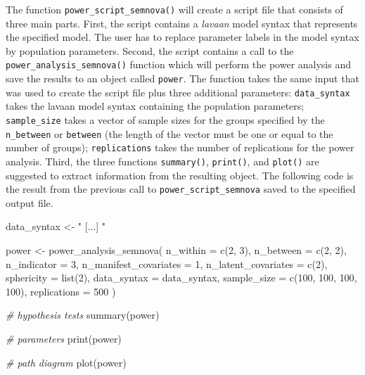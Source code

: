 \documentclass[
]{book}
\newenvironment{Shaded}{\begin{snugshade}}{\end{snugshade}}
\newcommand{\AttributeTok}[1]{\textcolor[rgb]{0.77,0.63,0.00}{#1}}
\newcommand{\CommentTok}[1]{\textcolor[rgb]{0.56,0.35,0.01}{\textit{#1}}}
\newcommand{\DecValTok}[1]{\textcolor[rgb]{0.00,0.00,0.81}{#1}}
\newcommand{\FunctionTok}[1]{\textcolor[rgb]{0.00,0.00,0.00}{#1}}
\newcommand{\NormalTok}[1]{#1}
\newcommand{\OtherTok}[1]{\textcolor[rgb]{0.56,0.35,0.01}{#1}}
\newcommand{\StringTok}[1]{\textcolor[rgb]{0.31,0.60,0.02}{#1}}
\begin{document}
The function \texttt{power\_script\_semnova()} will create a script file that consists of three main parts. First, the script contains a \emph{lavaan} model syntax that represents the specified model. The user has to replace parameter labels in the model syntax by population parameters. Second, the script contains a call to the \texttt{power\_analysis\_semnova()} function which will perform the power analysis and save the results to an object called \texttt{power}. The function takes the same input that was used to create the script file plus three additional parameters: \texttt{data\_syntax} takes the lavaan model syntax containing the population parameters; \texttt{sample\_size} takes a vector of sample sizes for the groups specified by the \texttt{n\_between} or \texttt{between} (the length of the vector must be one or equal to the number of groups); \texttt{replications} takes the number of replications for the power analysis. Third, the three functions \texttt{summary()}, \texttt{print()}, and \texttt{plot()} are suggested to extract information from the resulting object. The following code is the result from the previous call to \texttt{power\_script\_semnova} saved to the specified output file.

\begin{Shaded}
\begin{Highlighting}[]
\NormalTok{data\_syntax }\OtherTok{\textless{}{-}} \StringTok{"}
\StringTok{[...]}
\StringTok{"}

\NormalTok{power }\OtherTok{\textless{}{-}} \FunctionTok{power\_analysis\_semnova}\NormalTok{(}
    \AttributeTok{n\_within =} \FunctionTok{c}\NormalTok{(}\DecValTok{2}\NormalTok{, }\DecValTok{3}\NormalTok{),}
    \AttributeTok{n\_between =} \FunctionTok{c}\NormalTok{(}\DecValTok{2}\NormalTok{, }\DecValTok{2}\NormalTok{),}
    \AttributeTok{n\_indicator =} \DecValTok{3}\NormalTok{,}
    \AttributeTok{n\_manifest\_covariates =} \DecValTok{1}\NormalTok{,}
    \AttributeTok{n\_latent\_covariates =} \FunctionTok{c}\NormalTok{(}\DecValTok{2}\NormalTok{),}
    \AttributeTok{sphericity =} \FunctionTok{list}\NormalTok{(}\DecValTok{2}\NormalTok{),}
    \AttributeTok{data\_syntax =}\NormalTok{ data\_syntax,}
    \AttributeTok{sample\_size =} \FunctionTok{c}\NormalTok{(}\DecValTok{100}\NormalTok{, }\DecValTok{100}\NormalTok{, }\DecValTok{100}\NormalTok{, }\DecValTok{100}\NormalTok{),}
    \AttributeTok{replications =} \DecValTok{500}
\NormalTok{)}

\CommentTok{\# hypothesis tests}
\FunctionTok{summary}\NormalTok{(power)}

\CommentTok{\# parameters}
\FunctionTok{print}\NormalTok{(power)}

\CommentTok{\# path diagram}
\FunctionTok{plot}\NormalTok{(power)}
\end{Highlighting}
\end{Shaded}
\end{document}
